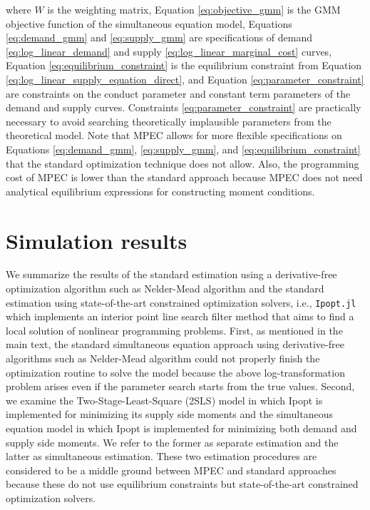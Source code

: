 \documentclass[11pt, a4paper]{article}
\begin{document}
where $W$ is the weighting matrix, Equation \eqref{eq:objective_gmm} is the GMM objective function of the simultaneous equation model, 
Equations \eqref{eq:demand_gmm} and \eqref{eq:supply_gmm} are specifications of demand \eqref{eq:log_linear_demand} and supply \eqref{eq:log_linear_marginal_cost} curves, 
Equation \eqref{eq:equilibrium_constraint} is the equilibrium constraint from Equation \eqref{eq:log_linear_supply_equation_direct}, and Equation \eqref{eq:parameter_constraint} are constraints on the conduct parameter and constant term parameters of the demand and supply curves. 
Constraints \eqref{eq:parameter_constraint} are practically necessary to avoid searching theoretically implausible parameters from the theoretical model. Note that MPEC allows for more flexible specifications on Equations \eqref{eq:demand_gmm}, \eqref{eq:supply_gmm}, and \eqref{eq:equilibrium_constraint} that the standard optimization technique does not allow. Also, the programming cost of MPEC is lower than the standard approach because MPEC does not need analytical equilibrium expressions for constructing moment conditions.





\section{Simulation results}\label{sec:results}

We summarize the results of the standard estimation using a derivative-free optimization algorithm such as Nelder-Mead algorithm and the standard estimation using state-of-the-art constrained optimization solvers, i.e., \texttt{Ipopt.jl} which implements an interior point line search filter method that aims to find a local solution of nonlinear programming problems. 
First, as mentioned in the main text, the standard simultaneous equation approach using derivative-free algorithms such as Nelder-Mead algorithm could not properly finish the optimization routine to solve the model because the above log-transformation problem arises even if the parameter search starts from the true values. 
Second, we examine the Two-Stage-Least-Square (2SLS) model in which Ipopt is implemented for minimizing its supply side moments and the simultaneous equation model in which Ipopt is implemented for minimizing both demand and supply side moments. 
We refer to the former as separate estimation and the latter as simultaneous estimation.
These two estimation procedures are considered to be a middle ground between MPEC and standard approaches because these do not use equilibrium constraints but state-of-the-art constrained optimization
solvers.
\end{document}
